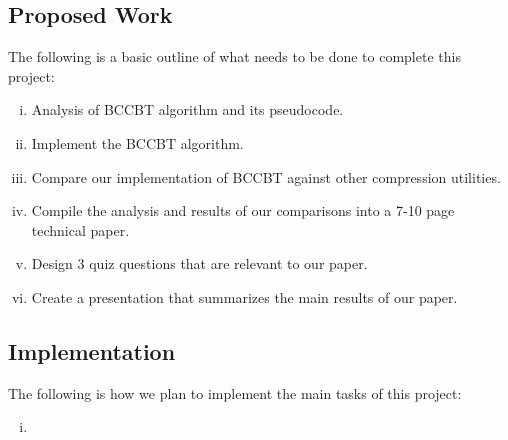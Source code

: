 \documentclass[11pt]{article}
\begin{document}
\subsection*{Proposed Work}
The following is a basic outline of what needs to be done to complete this project:
\begin{enumerate}[(i)]
\item Analysis of BCCBT algorithm and its pseudocode.
\item Implement the BCCBT algorithm. 
\item Compare our implementation of BCCBT against other compression utilities.
\item Compile the analysis and results of our comparisons into a 7-10 page technical paper.
\item Design 3 quiz questions that are relevant to our paper.
\item Create a presentation that summarizes the main results of our paper.
\end{enumerate}
\subsection*{Implementation}
The following is how we plan to implement the main tasks of this project:
\begin{enumerate}[(i)]
\item %
\end{enumerate}
\end{document}
